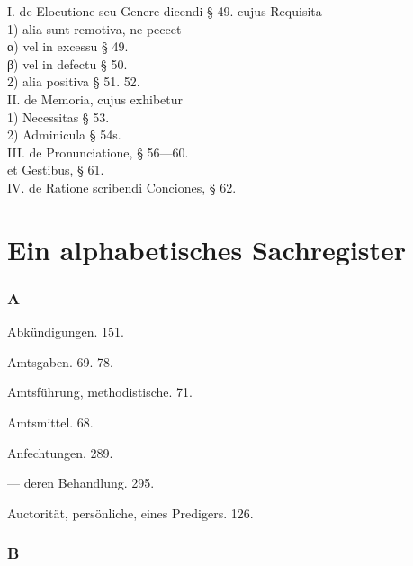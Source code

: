 \begin{flushleft}
\hspace*{1.2em}I. de Elocutione seu Genere dicendi § 49. cujus Requisita\\
\hspace*{2.4em}1) alia sunt remotiva, ne peccet\\
\hspace*{3.6em}α) vel in excessu § 49.\\
\hspace*{3.6em}β) vel in defectu § 50.\\
\hspace*{2.4em}2) alia positiva § 51. 52.\\
\hspace*{1.2em}II. de Memoria, cujus exhibetur\\
\hspace*{2.4em}1) Necessitas § 53.\\
\hspace*{2.4em}2) Adminicula § 54s.\\
\hspace*{1.2em}III. de Pronunciatione, § 56—60.\\
\hspace*{2.4em}et Gestibus, § 61.\\
\hspace*{1.2em}IV. de Ratione scribendi Conciones, § 62.
\end{flushleft}

\section{Ein alphabetisches Sachregister}

\subsubsection{A}

Abkündigungen. 151.

Amtsgaben. 69. 78.

Amtsführung, methodistische. 71.

Amtsmittel. 68.

Anfechtungen. 289.

— deren Behandlung. 295.

Auctorität, persönliche, eines Predigers. 126.

\subsubsection{B}

